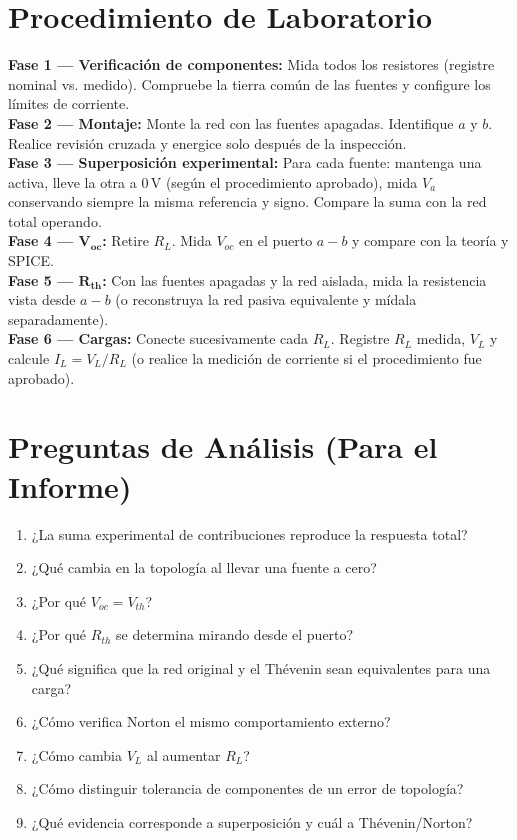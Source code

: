 \documentclass[11pt, a4paper]{article}
\begin{document}
\section{Procedimiento de Laboratorio}
\textbf{Fase 1 — Verificación de componentes:} Mida todos los resistores (registre nominal vs. medido). Compruebe la tierra común de las fuentes y configure los límites de corriente. \\
\textbf{Fase 2 — Montaje:} Monte la red con las fuentes apagadas. Identifique $a$ y $b$. Realice revisión cruzada y energice solo después de la inspección. \\
\textbf{Fase 3 — Superposición experimental:} Para cada fuente: mantenga una activa, lleve la otra a $0\,\text{V}$ (según el procedimiento aprobado), mida $V_a$ conservando siempre la misma referencia y signo. Compare la suma con la red total operando. \\
\textbf{Fase 4 — $\bm{V_{oc}}$:} Retire $R_L$. Mida $V_{oc}$ en el puerto $a-b$ y compare con la teoría y SPICE. \\
\textbf{Fase 5 — $\bm{R_{th}}$:} Con las fuentes apagadas y la red aislada, mida la resistencia vista desde $a-b$ (o reconstruya la red pasiva equivalente y mídala separadamente). \\
\textbf{Fase 6 — Cargas:} Conecte sucesivamente cada $R_L$. Registre $R_L$ medida, $V_L$ y calcule $I_L = V_L/R_L$ (o realice la medición de corriente si el procedimiento fue aprobado).

\section{Preguntas de Análisis (Para el Informe)}
\begin{enumerate}
    \item ¿La suma experimental de contribuciones reproduce la respuesta total?
    \item ¿Qué cambia en la topología al llevar una fuente a cero?
    \item ¿Por qué $V_{oc} = V_{th}$?
    \item ¿Por qué $R_{th}$ se determina mirando desde el puerto?
    \item ¿Qué significa que la red original y el Thévenin sean equivalentes para una carga?
    \item ¿Cómo verifica Norton el mismo comportamiento externo?
    \item ¿Cómo cambia $V_L$ al aumentar $R_L$?
    \item ¿Cómo distinguir tolerancia de componentes de un error de topología?
    \item ¿Qué evidencia corresponde a superposición y cuál a Thévenin/Norton?
\end{enumerate}
\end{document}
